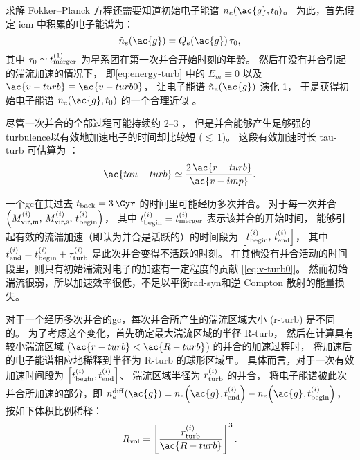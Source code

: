 求解 Fokker--Planck 方程还需要知道初始电子能谱 $n_e(\ac{g}, t_0)$。
为此，首先假定 \ac{icm} 中积累的电子能谱为：
\begin{equation}
  \tilde{n}_e(\ac{g}) = Q_e(\ac{g}) \,\tau_0 ,
\end{equation}
其中 $\tau_0 \simeq t_{\mathrm{merger}}^{(1)}$ 为星系团在第一次并合开始时刻的年龄。
然后在没有并合引起的湍流加速的情况下，
即\autoref{eq:energy-turb} 中的 $E_m \equiv 0$ 以及
$\ac{v-turb} \equiv \ac{v-turb0}$，
让电子能谱 $\tilde{n}_e(\ac{g})$ 演化 \SI{1}{\Gyr}，
于是获得初始电子能谱 $n_e(\ac{g}, t_0)$ 的一个合理近似 \cite{brunetti2007}。

尽管一次并合的全部过程可能持续约 \SIrange{2}{3}{\Gyr} \cite{tormen2004,cassano2016}，
但是并合能够产生足够强的\ac{turbulence}以有效地加速电子的时间却比较短
($\lesssim$\,\SI{1}{\Gyr})。
这段有效加速时长 \ac{tau-turb} 可估算为 \cite{miniati2015}：
\begin{equation}
  \ac{tau-turb} \simeq \frac{2\,\ac{r-turb}}{\ac{v-imp}} .
\end{equation}

一个\ac{gc}在其过去 $t_{\R{back}} = \SI{3}{\Gyr}$ 的时间里可能经历多次并合。
对于每一次并合 $\left( M^{(i)}_{\mathrm{vir,m}},\, M^{(i)}_{\mathrm{vir,s}},\,
t^{(i)}_{\mathrm{begin}} \right)$，
其中 $t^{(i)}_{\mathrm{begin}} = t^{(i)}_{\mathrm{merger}}$ 表示该并合的开始时间，
能够引起有效的流湍加速（即认为并合是活跃的）的时间段为
$\left[ t^{(i)}_{\mathrm{begin}},\, t^{(i)}_{\mathrm{end}} \right]$，
其中 $t^{(i)}_{\mathrm{end}} = t^{(i)}_{\mathrm{begin}}+\tau^{(i)}_{\mathrm{turb}}$
是此次并合变得不活跃的时刻。
在其他没有并合活动的时间段里，则只有初始湍流对电子的加速有一定程度的贡献
[\autoref{eq:v-turb0}]。
然而初始湍流很弱，所以加速效率很低，不足以平衡\ac{rad-syn}和逆 Compton 散射的能量损失。

对于一个经历多次并合的\ac{gc}，每次并合所产生的湍流区域大小 (\ac{r-turb}) 是不同的。
为了考虑这个变化，首先确定最大湍流区域的半径 \ac{R-turb}，
然后在计算具有较小湍流区域 ($\ac{r-turb} < \ac{R-turb}$) 的并合的加速过程时，
将加速后的电子能谱相应地稀释到半径为 \ac{R-turb} 的球形区域里。
具体而言，对于一次有效加速时间段为
$\left[ t^{(i)}_{\mathrm{begin}}, t^{(i)}_{\mathrm{end}} \right]$、
湍流区域半径为 $r^{(i)}_{\mathrm{turb}}$ 的并合，
将电子能谱被此次并合所加速的部分，即
$n_e^{\R{diff}}(\ac{g}) =
n_e\!\left(\ac{g}, t^{(i)}_{\R{end}}\right) -
n_e\!\left(\ac{g}, t^{(i)}_{\R{begin}}\right)$，
按如下体积比例稀释：
\begin{equation}
  \label{eq:ratio-v}
  R_{\R{vol}} = \left[ \frac{r^{(i)}_{\R{turb}}}{\ac{R-turb}} \right]^3 .
\end{equation}


